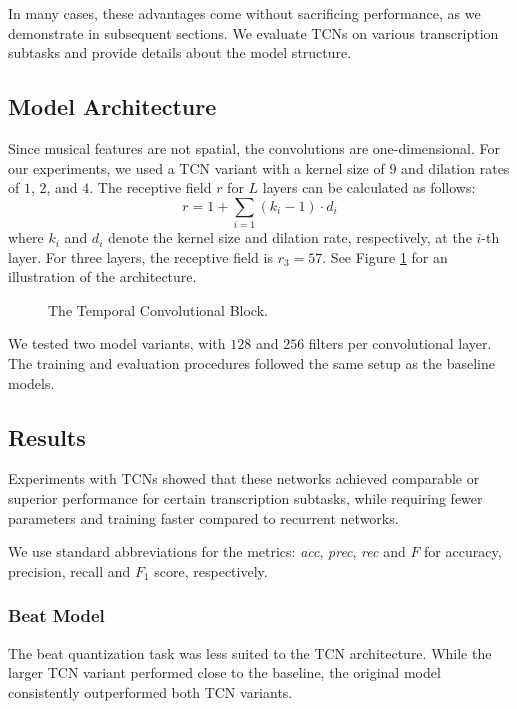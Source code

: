 In many cases, these advantages come without sacrificing performance, as we demonstrate in subsequent sections. We evaluate TCNs on various transcription subtasks and provide details about the model structure.

\subsection{Model Architecture}

Since musical features are not spatial, the convolutions are one-dimensional. For our experiments, we used a TCN variant with a kernel size of $9$ and dilation rates of $1$, $2$, and $4$. The receptive field $r$ for $L$ layers can be calculated as follows: \[r = 1 + \sum_{i=1}\left(k_i - 1\right)\cdot d_i\] where $k_i$ and $d_i$ denote the kernel size and dilation rate, respectively, at the $i$-th layer. For three layers, the receptive field is $r_3 = 57$. See Figure \ref{temporal_convolutional_network} for an illustration of the architecture.

\begin{figure}[ht!]
\centering

\caption[The Temporal Convolutional Block.]{The Temporal Convolutional Block.}
\label{temporal_convolutional_network}
\end{figure}

We tested two model variants, with $128$ and $256$ filters per convolutional layer. The training and evaluation procedures followed the same setup as the baseline models.

\subsection{Results}

Experiments with TCNs showed that these networks achieved comparable or superior performance for certain transcription subtasks, while requiring fewer parameters and training faster compared to recurrent networks.

We use standard abbreviations for the metrics: \emph{acc}, \emph{prec}, \emph{rec} and $F$ for accuracy, precision, recall and $F_1$ score, respectively.

\subsubsection{Beat Model}

The beat quantization task was less suited to the TCN architecture. While the larger TCN variant performed close to the baseline, the original model consistently outperformed both TCN variants.

